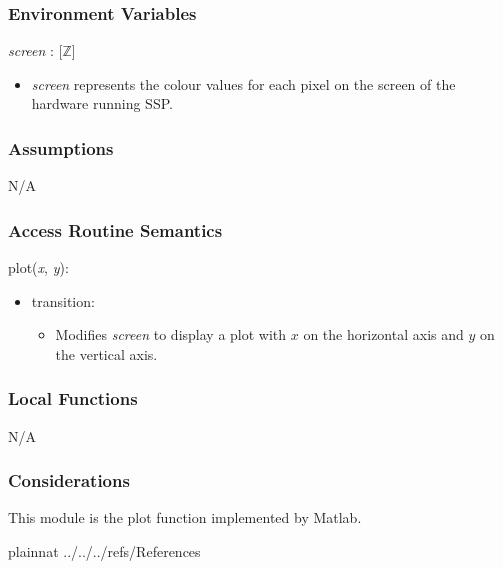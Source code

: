 \documentclass[12pt, titlepage]{article}
\newcommand{\progname}{SSP}
\begin{document}
\subsubsection{Environment Variables}

\textit{screen} : [$\mathbb{Z}$]
\begin{itemize}
	\item \textit{screen} represents the colour values for each pixel on the 
	screen of the hardware running \progname{}. \\
\end{itemize}

\subsubsection{Assumptions}

N/A

\subsubsection{Access Routine Semantics}

plot(\textit{x}, \textit{y}):
\begin{itemize}
	\item transition: 
	\begin{itemize}
		\item[] Modifies \textit{screen} to display a plot with $x$ on the 
		horizontal axis and $y$ on the vertical axis.
	\end{itemize}
\end{itemize}

\subsubsection{Local Functions}

N/A

\subsubsection{Considerations}
This module is the plot function implemented by Matlab.

\newpage

 {plainnat}
 {../../../refs/References}

\newpage

\end{document}
